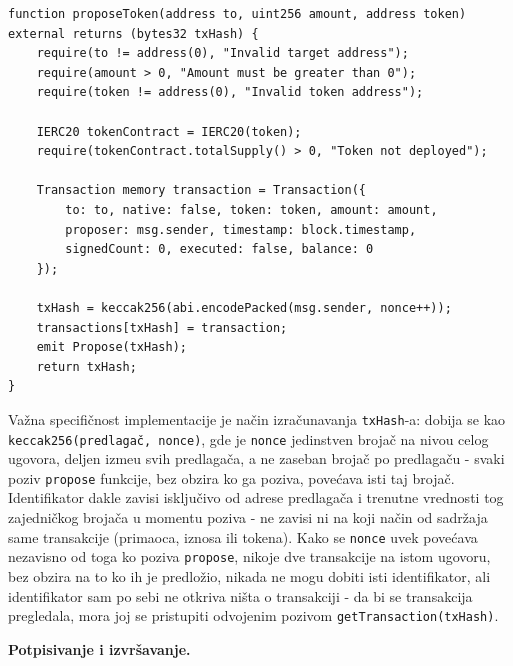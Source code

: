 \begin{lstlisting}[caption={Predlaganje token transakcije}, label={lst:multisig-propose}]
function proposeToken(address to, uint256 amount, address token) external returns (bytes32 txHash) {
    require(to != address(0), "Invalid target address");
    require(amount > 0, "Amount must be greater than 0");
    require(token != address(0), "Invalid token address");

    IERC20 tokenContract = IERC20(token);
    require(tokenContract.totalSupply() > 0, "Token not deployed");

    Transaction memory transaction = Transaction({
        to: to, native: false, token: token, amount: amount,
        proposer: msg.sender, timestamp: block.timestamp,
        signedCount: 0, executed: false, balance: 0
    });

    txHash = keccak256(abi.encodePacked(msg.sender, nonce++));
    transactions[txHash] = transaction;
    emit Propose(txHash);
    return txHash;
}
\end{lstlisting}

Va\v zna specifi\v cnost implementacije je na\v cin izra\v cunavanja \texttt{txHash}-a: dobija se kao \texttt{keccak256(predlaga\v c, nonce)}, gde je \texttt{nonce} jedinstven broja\v c na nivou celog ugovora, deljen izme\dj u svih predlaga\v ca, a ne zaseban broja\v c po predlaga\v cu - svaki poziv \texttt{propose} funkcije, bez obzira ko ga poziva, pove\' cava isti taj broja\v c. Identifikator dakle zavisi isklju\v civo od adrese predlaga\v ca i trenutne vrednosti tog zajedni\v ckog broja\v ca u momentu poziva - ne zavisi ni na koji na\v cin od sadr\v zaja same transakcije (primaoca, iznosa ili tokena). Kako se \texttt{nonce} uvek pove\' cava nezavisno od toga ko poziva \texttt{propose}, nikoje dve transakcije na istom ugovoru, bez obzira na to ko ih je predlo\v zio, nikada ne mogu dobiti isti identifikator, ali identifikator sam po sebi ne otkriva ni\v sta o transakciji - da bi se transakcija pregledala, mora joj se pristupiti odvojenim pozivom \texttt{getTransaction(txHash)}.
\newpage

\textbf{Potpisivanje i izvr\v savanje.}

